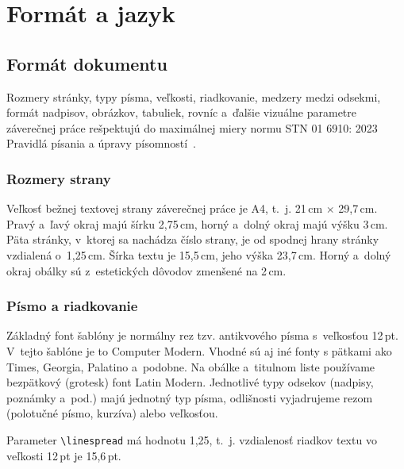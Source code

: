 \chapter{Formát a jazyk}\label{sec:formatLanguage}
\section{Formát dokumentu}
Rozmery stránky, typy písma, veľkosti, riadkovanie,
medzery medzi odsekmi, formát nadpisov, obrázkov, tabuliek,
rovníc a~ďalšie vizuálne parametre záverečnej práce
rešpektujú do maximálnej miery normu STN 01 6910: 2023
Pravidlá písania a úpravy písomností~\cite{stn016910}.

\subsection*{Rozmery strany}
Veľkosť bežnej textovej strany záverečnej práce je A4,
t.~j. 21\,cm $\times$ 29,7\,cm.
Pravý a~ľavý okraj majú šírku 2,75\,cm,
horný a~dolný okraj majú výšku 3\,cm.
Päta stránky, v~ktorej sa nachádza číslo strany,
je od spodnej hrany stránky vzdialená o~1,25\,cm.
Šírka textu je 15,5\,cm, jeho výška 23,7\,cm.
Horný a~dolný okraj obálky sú z~estetických
dôvodov zmenšené na 2\,cm.

\subsection*{Písmo a riadkovanie}
Základný font šablóny je normálny rez tzv. antikvového písma
s~veľkosťou 12\,pt.
V~tejto šablóne je to Computer Modern.
Vhodné sú aj iné fonty s pätkami ako Times, Georgia, Palatino a~podobne.
Na obálke a~titulnom liste používame bezpätkový (grotesk) font Latin Modern.
Jednotlivé typy odsekov (nadpisy, poznámky a~pod.)
majú jednotný typ písma,
odlišnosti vyjadrujeme rezom (polotučné písmo, kurzíva)
alebo veľkosťou.

Parameter \verb|\linespread| má hodnotu 1,25, t.~j.
vzdialenosť riadkov textu vo veľkosti 12\,pt je 15,6\,pt.

